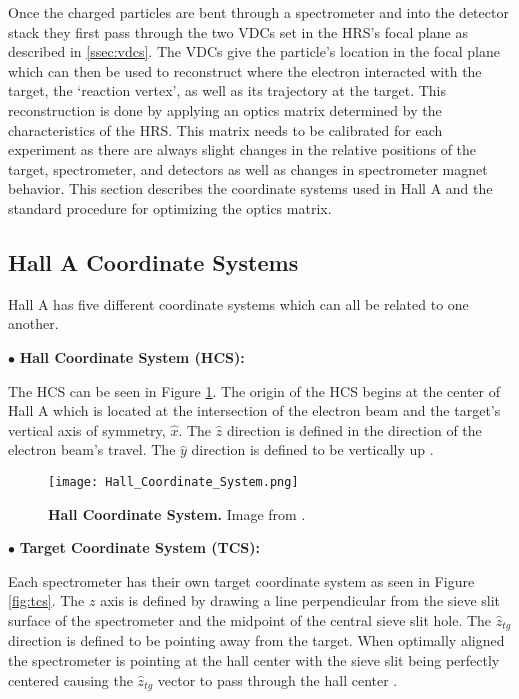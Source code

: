 Once the charged particles are bent through a spectrometer and into the detector stack they first pass through the two VDCs set in the HRS's focal plane as described in \ref{ssec:vdcs}. The VDCs give the particle's location in the focal plane which can then be used to reconstruct where the electron interacted with the target, the `reaction vertex', as well as its trajectory at the target. This reconstruction is done by applying an optics matrix determined by the characteristics of the HRS. This matrix needs to be calibrated for each experiment as there are always slight changes in the relative positions of the target, spectrometer, and detectors as well as changes in spectrometer magnet behavior. This section describes the coordinate systems used in Hall A and the standard procedure for optimizing the optics matrix. 

\subsection{Hall A Coordinate Systems}
\label{ssec:coordinates}

Hall A has five different coordinate systems which can all be related to one another. 

\noindent $\bullet$ \textbf{Hall Coordinate System (HCS):}

The HCS can be seen in Figure \ref{fig:hcs}. The origin of the HCS begins at the center of Hall A which is located at the intersection of the electron beam and the target's vertical axis of symmetry, $\hat{x}$. The $\hat{z}$ direction is defined in the direction of the electron beam's travel. The $\hat{y}$ direction is defined to be vertically up \cite{optics}.

\begin{figure}[!ht]
\begin{center}
\texttt{[image: Hall\_Coordinate\_System.png]}
\end{center}
\caption[Hall Coordinate System]{
{\bf{Hall Coordinate System.}} Image from \cite{optics}.}
\label{fig:hcs}
\end{figure}

\noindent $\bullet$ \textbf{Target Coordinate System (TCS):}

Each spectrometer has their own target coordinate system as seen in Figure \ref{fig:tcs}. The $z$ axis is defined by drawing a line perpendicular from the sieve slit surface of the spectrometer and the midpoint of the central sieve slit hole. The $\hat{z}_{tg}$ direction is defined to be pointing away from the target. When optimally aligned the spectrometer is pointing at the hall center with the sieve slit being perfectly centered causing the $\hat{z}_{tg}$ vector to pass through the hall center \cite{optics}. 

